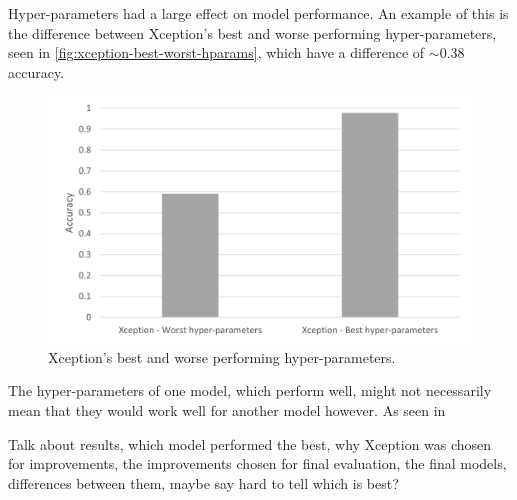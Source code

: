 Hyper-parameters had a large effect on model performance. An example of this is the difference between Xception's best and worse performing hyper-parameters, seen in \autoref{fig:xception-best-worst-hparams}, which have a difference of $\sim$0.38 accuracy.

\begin{figure}[H]
    \centering
    \includegraphics[width=\textwidth]{figures/xception-best-worst-hparams.png}
    \caption{Xception's best and worse performing hyper-parameters.}
    \label{fig:xception-best-worst-hparams}
\end{figure}

The hyper-parameters of one model, which perform well, might not necessarily mean that they would work well for another model however. As seen in 

Talk about results, which model performed the best, why Xception was chosen for improvements, the improvements chosen for final evaluation, the final models, differences between them, maybe say hard to tell which is best?

